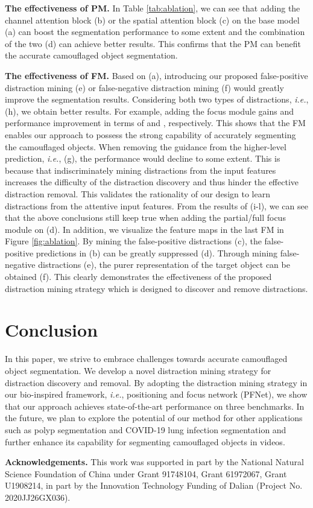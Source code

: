\documentclass[final]{cvpr}
\begin{document}
\textbf{The effectiveness of PM.} In Table \ref{tab:ablation}, we can see that adding the channel attention block (b) or the spatial attention block (c) on the base model (a) can boost the segmentation performance to some extent and the combination of the two (d) can achieve better results. This confirms that the PM can benefit the accurate camouflaged object segmentation.

\textbf{The effectiveness of FM.} Based on (a), introducing our proposed false-positive distraction mining (e) or false-negative distraction mining (f) would greatly improve the segmentation results. Considering both two types of distractions, \emph{i.e.}, (h), we obtain better results. For example, adding the focus module gains  and  performance improvement in terms of  and , respectively. This shows that the FM enables our approach to possess the strong capability of accurately segmenting the camouflaged objects. When removing the guidance from the higher-level prediction, \emph{i.e.}, (g), the performance would decline to some extent. This is because that indiscriminately mining distractions from the input features increases the difficulty of the distraction discovery and thus hinder the effective distraction removal. This validates the rationality of our design to learn distractions from the attentive input features. 
From the results of (i-l), we can see that the above conclusions still keep true when adding the partial/full focus module on (d).
In addition, we visualize the feature maps in the last FM in Figure \ref{fig:ablation}. By mining the false-positive distractions (c), the false-positive predictions in (b) can be greatly suppressed (d). Through mining false-negative distractions (e), the purer representation of the target object can be obtained (f). This clearly demonstrates the effectiveness of the proposed distraction mining strategy which is designed to discover and remove distractions.


\section{Conclusion}
In this paper, we strive to embrace challenges towards accurate camouflaged object segmentation. We develop a novel distraction mining strategy for distraction discovery and removal. By adopting the distraction mining strategy in our bio-inspired framework, \emph{i.e.}, positioning and focus network (PFNet), we show that our approach achieves state-of-the-art performance on three benchmarks.
In the future, we plan to explore the potential of our method for other applications such as polyp segmentation and COVID-19 lung infection segmentation and further enhance its capability for segmenting camouflaged objects in videos.

\vspace{4mm}
\textbf{Acknowledgements.} This work was supported in part by the National Natural Science Foundation of China under Grant 91748104, Grant 61972067, Grant U1908214, in part by the Innovation Technology Funding of Dalian (Project No. 2020JJ26GX036).

\clearpage
{\small


}
\end{document}

